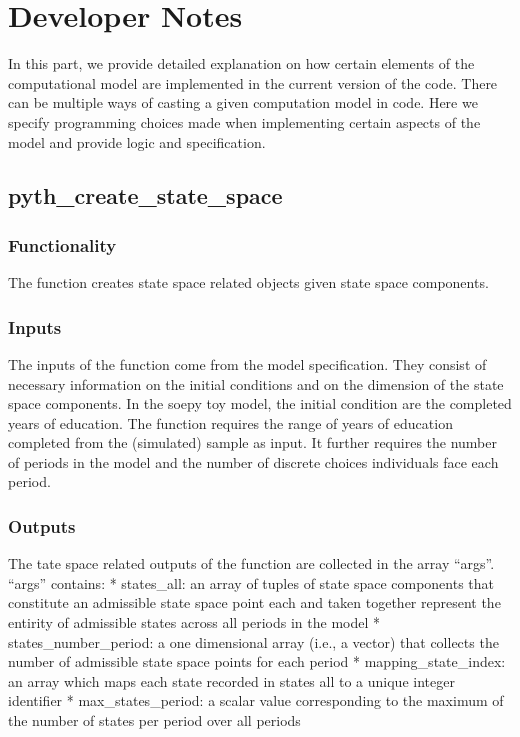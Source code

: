 \documentclass[letterpaper,10pt,english]{sphinxmanual}
\begin{document}
\chapter{Developer Notes}
\label{\detokenize{developer_docs:developer-notes}}\label{\detokenize{developer_docs::doc}}
In this part, we provide detailed explanation on how certain elements of the computational model are implemented in the current version of the code. There can be multiple ways of casting a given computation model in code. Here we specify programming choices made when implementing certain aspects of the model and provide logic and specification.


\section{pyth\_create\_state\_space}
\label{\detokenize{developer_docs:pyth-create-state-space}}

\subsection{Functionality}
\label{\detokenize{developer_docs:functionality}}
The function creates state space related objects given state space components.


\subsection{Inputs}
\label{\detokenize{developer_docs:inputs}}
The inputs of the function come from the model specification. They consist of necessary information on the initial conditions and on the dimension of the state space components. In the soepy toy model, the initial condition are the completed years of education. The function requires the range of years of education completed from the (simulated) sample as input. It further requires the number of periods in the model and the number of discrete choices individuals face each period.


\subsection{Outputs}
\label{\detokenize{developer_docs:outputs}}
The tate space related outputs of the function are collected in the array “args”. “args” contains:
* states\_all: an array of tuples of state space components that constitute an admissible state space point each and taken together represent the entirity of admissible states across all periods in the model
* states\_number\_period: a one dimensional array (i.e., a vector) that collects the number of admissible state space points for each period
* mapping\_state\_index: an array which maps each state recorded in states all to a unique integer identifier
* max\_states\_period: a scalar value corresponding to the maximum of the number of states per period over all periods
\end{document}
